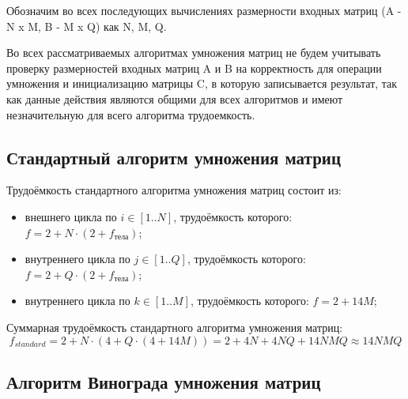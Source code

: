 Обозначим во всех последующих вычислениях размерности входных матриц (A - N x M, B - M x Q) как N, M, Q.

Во всех рассматриваемых алгоритмах умножения матриц не будем учитывать проверку размерностей входных матриц A и B на корректность для операции умножения и инициализацию матрицы C, в которую записывается результат, так как данные действия являются общими для всех алгоритмов и имеют незначительную для всего алгоритма трудоемкость.

\subsection{Стандартный алгоритм умножения матриц}

Трудоёмкость стандартного алгоритма умножения матриц состоит из:
\begin{itemize}
	\item внешнего цикла по $i \in [1..N]$, трудоёмкость которого: $f = 2 + N \cdot (2 + f_{тела})$;
	\item внутреннего цикла по $j \in [1..Q]$, трудоёмкость которого: $f = 2 + Q \cdot (2 + f_{тела})$;
	\item внутреннего цикла по $k \in [1..M]$, трудоёмкость которого: $f = 2 + 14M$;
\end{itemize}

Суммарная трудоёмкость стандартного алгоритма умножения матриц:
\begin{equation}
	\label{for:standard}
	f_{standard} = 2 + N \cdot (4 + Q \cdot (4 + 14M)) = 2 + 4N + 4NQ + 14NMQ \approx 14NMQ
\end{equation}

\subsection{Алгоритм Винограда умножения матриц}

